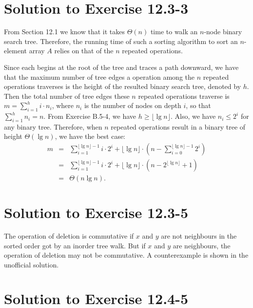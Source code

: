 \documentclass[a4paper, fleqn]{article}
\begin{document}
\section*{Solution to Exercise 12.3-3}

From Section 12.1 we know that it takes $\Theta(n)$ time to walk an
$n$-node binary search tree. Therefore, the running time of such a
sorting algorithm to sort an $n$-element array $A$ relies on that of
the $n$ repeated  operations.

Since each  begins at the root of the tree and
traces a path downward, we have that the maximum number of tree edges
a  operation among the $n$ repeated operations
traverses is the height of the resulted binary search tree, denoted by
$h$. Then the total number of tree edges these $n$ repeated operations
traverse is $m = \sum_{i=1}^h i \cdot n_i$, where $n_i$ is the number
of nodes on depth $i$, so that $\sum_{i=1}^hn_i = n$. From Exercise
B.5-4, we have $h \geq \lfloor \lg n \rfloor$. Also, we have $n_i \leq
2^i$ for any binary tree. Therefore, when $n$ repeated
 operations result in a binary tree of height
$\Theta(\lg n)$, we have the best case:
\begin{eqnarray*}
m & = & \sum_{i=1}^{\lfloor \lg n \rfloor - 1} i \cdot 2^i +
\lfloor \lg n \rfloor \cdot (n - \sum_{i=0}^{\lfloor \lg n \rfloor - 1} 2^i) \\
  & = &  \sum_{i=1}^{\lfloor \lg n \rfloor - 1} i \cdot 2^i + \lfloor
\lg n \rfloor \cdot (n - 2^{\lfloor \lg n \rfloor} + 1) \\
  & = & \Theta(n \lg n).
\end{eqnarray*}




\section*{Solution to Exercise 12.3-5}

The operation of deletion is commutative if $x$ and $y$ are not
neighbours in the sorted order got by an inorder tree walk. But if $x$
and $y$ are neighbours, the operation of deletion may not be
commutative. A counterexample is shown in the unofficial solution.




\section*{Solution to Exercise 12.4-5}
\end{document}
